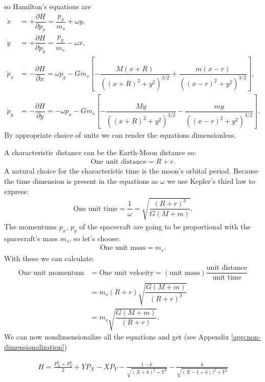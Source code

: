 so Hamilton's equations are
\begin{align}
\dot{x} &= +\dfrac{\partial H}{\partial p_x} = \dfrac{p_x}{m_s} + \omega y, \\[0.4cm]
\dot{y} &= +\dfrac{\partial H}{\partial p_y} = \dfrac{p_y}{m_s} - \omega x, \\[0.4cm]
\dot{p}_x &= -\dfrac{\partial H}{\partial x} = \omega p_y - G m_s \left[-\dfrac{M(x+R)}{((x+R)^2+y^2)^{3/2}} + \dfrac{m(x-r)}{((x-r)^2+y^2)^{3/2}} \right], \\[0.4cm]
\dot{p}_y &= -\dfrac{\partial H}{\partial y} = -\omega p_x - G m_s \left[- \dfrac{M y}{((x+R)^2+y^2)^{3/2}} - \dfrac{m y}{((x-r)^2+y^2)^{3/2}}\right].
\end{align}
By appropriate choice of units we can render the equations dimensionless.

A characteristic distance can be the Earth-Moon distance so:
\begin{align}
\text{One unit distance} = R+r .
\end{align}
A natural choice for the characteristic time is the moon's orbital period. Because the time dimension is present in the equations as $\omega$ we use Kepler's third law to express: \cite{Murray1999}
\begin{align}
\text{One unit time} = \dfrac{1}{\omega} = \sqrt{\dfrac{(R+r)^3}{G(M+m)}}.
\end{align}
The momentums $p_x$, $p_y$ of the spacecraft are going to be proportional with the spacecraft's mass $m_s$, so let's choose:
\begin{align}
\text{One unit mass} = m_s.
\end{align}
With these we can calculate:
\begin{align}
\nonumber \text{One unit momentum} &= \text{One unit velocity} = (\text{unit mass})\dfrac{\text{unit distance}}{\text{unit time}} \\[0.3cm]
\nonumber &= m_s(R+r)\sqrt{\dfrac{G(M+m)}{(R+r)^3}} \\[0.3cm]
&= m_s \sqrt{\dfrac{G(M+m)}{(R+r)}}.
\end{align}
We can now nondimensionalize all the equations and get (see Appendix \ref{app:non-dimensionalization})

\begin{align}
  H = \frac{P_X^2 + P_Y^2}{2} + Y P_X - X P_Y - \frac{1 -k}{\sqrt{(X+k)^2 + Y^2 }} - \frac{k}{\sqrt{(X-1+k))^2 + Y^2}}
\end{align}

